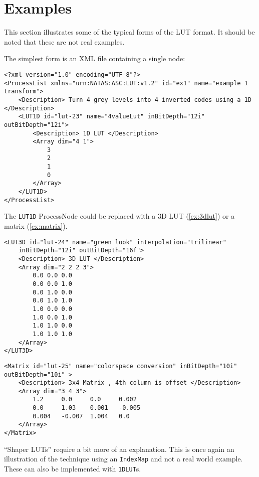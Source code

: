 \regularsectionformat
\chapter{Examples}
\label{sec:examples}

This section illustrates some of the typical forms of the LUT format. It should be noted that these are not real examples.

The simplest form is an XML file containing a single node:

\begin{lstlisting}[caption=Example of a ``LUT1D'']
<?xml version="1.0" encoding="UTF-8"?>
<ProcessList xmlns="urn:NATAS:ASC:LUT:v1.2" id="ex1" name="example 1 transform">
	<Description> Turn 4 grey levels into 4 inverted codes using a 1D </Description>
	<LUT1D id="lut-23" name="4valueLut" inBitDepth="12i" outBitDepth="12i">
		<Description> 1D LUT </Description>
		<Array dim="4 1">
			3
			2
			1
			0
		</Array>
	</LUT1D>
</ProcessList>
\end{lstlisting}

The \texttt{LUT1D} ProcessNode could be replaced with a 3D LUT (\autoref{ex:3dlut}) or a matrix (\autoref{ex:matrix}).

\begin{lstlisting}[caption=Example of a \texttt{LUT3D},label=ex:3dlut]
<LUT3D id="lut-24" name="green look" interpolation="trilinear" 
	inBitDepth="12i" outBitDepth="16f">
	<Description> 3D LUT </Description>
	<Array dim="2 2 2 3">
		0.0 0.0 0.0
		0.0 0.0 1.0
		0.0 1.0 0.0
		0.0 1.0 1.0
		1.0 0.0 0.0
		1.0 0.0 1.0
		1.0 1.0 0.0
		1.0 1.0 1.0
	</Array>
</LUT3D>

\end{lstlisting}

\begin{lstlisting}[caption=Example of a \texttt{Matrix},label=ex:matrix]
<Matrix id="lut-25" name="colorspace conversion" inBitDepth="10i" outBitDepth="10i" >
	<Description> 3x4 Matrix , 4th column is offset </Description>
	<Array dim="3 4 3">
		1.2  	0.0  	0.0   	0.002
		0.0 	1.03 	0.001 	-0.005
		0.004 	-0.007 	1.004  	0.0
	</Array>
</Matrix>

\end{lstlisting}

``Shaper LUTs'' require a bit more of an explanation.  This is once again an illustration of the technique using an \texttt{IndexMap} and not a real world example. These can also be implemented with \texttt{1DLUT}s.

